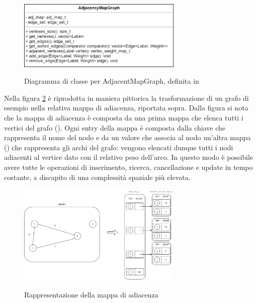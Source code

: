 \begin{figure}[h]
	\caption{Diagramma di classe per AdjacentMapGraph, definita in }
	\centering
	\includegraphics[width=0.7\textwidth]{./images/AdjancencyMapGrapClass.png}
	\label{fig:AdjMapGraph Class}
\end{figure}

Nella figura \ref{fig:AdjMapGraph Abstract} è riprodotta in maniera pittorica la trasformazione di un grafo di esempio nella relativa mappa di adiacenza, riportata sopra. Dalla figura si nota che la mappa di adiacenza è composta da una prima mappa che elenca tutti i vertici del grafo (). Ogni entry della mappa è composta dalla chiave che rappresenta il nome del nodo e da un valore che associa al nodo un'altra mappa () che rappresenta gli archi del grafo: vengono elencati dunque tutti i nodi adiacenti al vertice dato con il relativo peso dell'arco. In questo modo è possibile avere tutte le operazioni di inserimento, ricerca, cancellazione e update in tempo costante, a discapito di una complessità spaziale più elevata. 

\begin{figure}[h]
	\caption{Rappresentazione della mappa di adiacenza}
	\centering
	\includegraphics[width=0.7\textwidth]{./images/AdjMapGraphAbstract.png}
	\label{fig:AdjMapGraph Abstract}
\end{figure}

